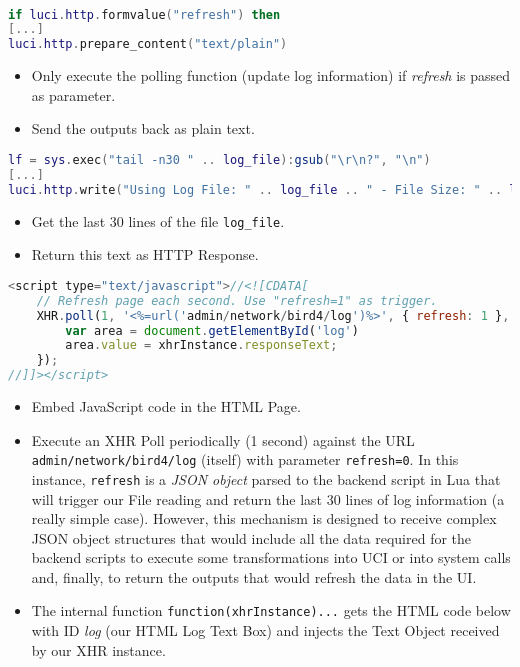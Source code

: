\\
\begin{lstlisting}[language=lua,caption={Lua - Log Code (I)}]
if luci.http.formvalue("refresh") then
[...]
luci.http.prepare_content("text/plain")
\end{lstlisting}
\begin{itemize}
    \item Only execute the polling function (update log information) if \textit{refresh} is passed as parameter.
    \item Send the outputs back as plain text.
\end{itemize}

\begin{lstlisting}[language=lua,caption={Lua - Log Code (II)}]
lf = sys.exec("tail -n30 " .. log_file):gsub("\r\n?", "\n")
[...]
luci.http.write("Using Log File: " .. log_file .. " - File Size: " .. log_size .. "\n" .. lf)
\end{lstlisting}
\begin{itemize}
    \item Get the last 30 lines of the file \texttt{log\_file}.
    \item Return this text as HTTP Response.
\end{itemize}

\begin{lstlisting}[language=javascript,caption={JavaScript - Log Code (III)}]
<script type="text/javascript">//<![CDATA[
    // Refresh page each second. Use "refresh=1" as trigger.
    XHR.poll(1, '<%=url('admin/network/bird4/log')%>', { refresh: 1 },       function(xhrInstance) {
        var area = document.getElementById('log')
        area.value = xhrInstance.responseText;
    });
//]]></script>
\end{lstlisting}
\begin{itemize}
    \item Embed JavaScript code in the HTML Page.
    \item Execute an XHR Poll periodically (1 second) against the URL \texttt{admin/network/bird4/log} (itself) with parameter \texttt{refresh=0}.
    In this instance, \texttt{refresh} is a \textit{JSON object} parsed to the backend script in Lua that will trigger our File reading and return the last 30 lines of log information (a really simple case).
    However, this mechanism is designed to receive complex JSON object structures that would include all the data required for the backend scripts to execute some transformations into UCI or into system calls and, finally, to return the outputs that would refresh the data in the UI.
    \item The internal function \texttt{function(xhrInstance)...} gets the HTML code below with ID \textit{log} (our HTML Log Text Box) and injects the Text Object received by our XHR instance.
\end{itemize}

